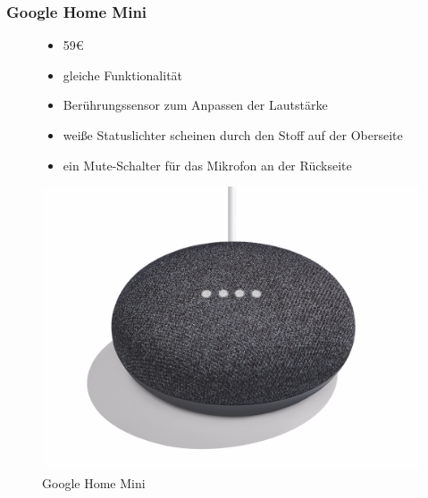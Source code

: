 \subsubsection{Google Home Mini}
\begin{figure}[H]
	\begin{minipage}{0.45\textwidth}
	  \begin{itemize}
	  \item 59€
	  \item gleiche Funktionalität
	  \item Berührungssensor zum Anpassen der Lautstärke
	  \item weiße Statuslichter scheinen durch den Stoff auf der Oberseite
	  \item ein Mute-Schalter für das Mikrofon an der Rückseite
	  \end{itemize}
	\end{minipage}
	\hfill
	\begin{minipage}{0.45\textwidth}
	  \centering
      \includegraphics[width=\textwidth]{content/img/GoogleHomeMini}
      \caption[Google Home Mini]{Google Home Mini}
	\end{minipage}
\end{figure}

